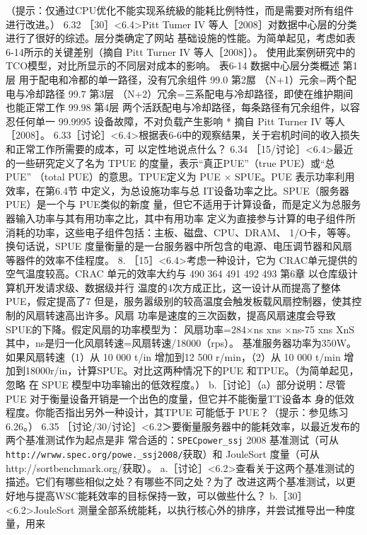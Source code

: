 （提示：仅通过CPU优化不能实现系统級的能耗比例特性，而是需要对所有组件进行改进。）
6.32
［30］<6.4>Pitt Tumer IV 等人［2008］对数据中心层的分类进行了很好的综述。层分类确定了网站
基础设施的性能。为简单起见，考虑如表6-14所示的关键差别（摘自 Pitt Turner IV 等人［2008］）。
使用此案例研究中的 TCO模型，对比所显示的不同层对成本的影响。
表6-14 数据中心层分类概述
第1层
用于配电和冷都的单一路径，没有冗余组件
99.0%
第2𡲢
（N+1）元余=两个配电与冷却路径
99.7%
第3层
（N+2）冗余=三系配电与冷却路径，即使在维护期间也能正常工作
99.98%
第4层
两个活跃配电与冷却路径，每条路径有冗余组件，以容忍任何单一
99.9995%
设备故障，不对负载产生影响
* 摘自 Pitt Turner IV 等人［2008］。
6.33［讨论］<6.4>根据表6-6中的观察结果，关于宕机时间的收入损失和正常工作所需要的成本，可
以定性地说点什么？
6.34 ［15/讨论］<6.4>最近的一些研究定义了名为 TPUE 的度量，表示“真正PUE”（true PUE）或“总
PUE” （total PUE）的意思。TPUE定义为 PUE × SPUE。PUE 表示功率利用效率，在第6.4节
中定义，为总设施功率与总 IT设备功率之比。SPUE（服务器PUE）是一个与 PUE类似的新度
量，但它不适用于计算设备，而是定义为总服务器输入功率与其有用功率之比，其中有用功率
定义为直接参与计算的电子组件所消耗的功率，这些电子组件包括：主板、磁盘、CPU、DRAM、
1/O卡，等等。换句话说，SPUE 度量衡量的是一台服务器中所包含的电源、电压调节器和风扇
等器件的效率不佳程度。
8. ［15］<6.4>考虑一种设计，它为 CRAC单元提供的空气温度较高。CRAC 单元的效率大约与
490
364
491
492
493
第6章 以仓库级计算机开发请求级、数据级并行
温度的4次方成正比，这一设计从而提高了整体PUE，假定提高了7%
但是，服务嚣级别的较高温度会触发板载风扇控制器，使其控制的风扇转速高出许多。风扇
功率是速度的三次函数，提高风扇速度会导致 SPUE的下降。假定风扇的功率模型为：
风扇功率=284×ns xns ×ns-75 xns XnS
其中，ns是归一化风扇转速=风扇转速/18000（rps）。
基准服务器功率为350W。如果风扇转速（1）从 10 000 t/in 增加到12 500 r/min，（2）从 10 000 t/min
增加到18000r/in，计算SPUE。对比这两种情况下的PUE 和TPUE。（为简单起见，忽略
在 SPUE 模型中功率输出的低效程度。）
b.［讨论］（a）部分说明：尽管PUE 对于衡量设备开销是一个出色的度量，但它并不能衡量TT设备本
身的低效程度。你能否指出另外一种设计，其TPUE 可能低于 PUE？（提示：参见练习6.26。）
6.35
［讨论/30/讨论］<6.2＞要衡量服务器中的能耗效率，以最近发布的两个基准测试作为起点是非
常合适的：\verb|SPECpower_ssj| 2008 基准测试（可从 \verb|http://wrww.spec.org/powe._ssj2008/|获取）和
JouleSort 度量（可从 http://sortbenchmark.org/获取）。
a.［讨论］<6.2>查看关于这两个基准测试的描述。它们有哪些相似之处？有哪些不同之处？为了
改进这两个基准测试，以更好地与提高WSC能耗效率的目标保持一致，可以做些什么？
b.［30］ <6.2>JouleSort 测量全部系统能耗，以执行核心外的排序，并尝试推导出一种度量，用来

